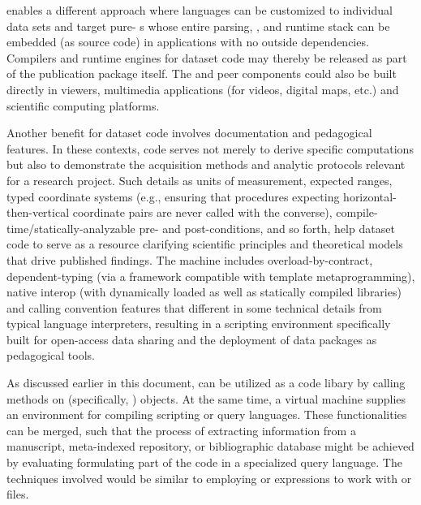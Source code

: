 \documentclass[11pt]{article}
\begin{document}
{{\begin{description}
\pseudoIndent{} \lPacTk{} enables a different approach where 
languages can be customized to individual data sets and target 
pure-\Cpp{} \VM{}s whose entire parsing, \IR{}, and runtime stack 
can be embedded (as source code) in \Cpp{} \GUI{} applications with no outside 
dependencies.  Compilers and runtime engines for dataset code may 
thereby be released as part of the publication package itself.  
The \VM{} and peer components could also be built directly 
in \PDF{} viewers, multimedia applications (for videos, digital 
maps, etc.) and scientific computing platforms.

\pseudoIndent{} Another \PacTk{} benefit for dataset code involves 
documentation and pedagogical features.  In these contexts, code 
serves not merely to derive specific computations but also 
to demonstrate the acquisition methods and analytic protocols relevant 
for a research project.  Such details as units of measurement, 
expected ranges, typed coordinate systems (e.g., ensuring that 
procedures expecting horizontal-then-vertical coordinate 
pairs are never called with the converse), 
compile-time/statically-analyzable pre- and post-conditions, and so forth, 
help dataset code to serve as a resource clarifying scientific 
principles and theoretical models that drive published findings.  
The \PacTk{} machine includes overload-by-contract, dependent-typing 
(via a framework compatible with template metaprogramming), native 
interop (with dynamically loaded as well as statically compiled libraries) 
and  calling convention features that different 
in some technical details from typical language interpreters, 
resulting in a scripting environment specifically built for 
open-access data sharing and the deployment of data packages 
as pedagogical tools.    

\item[Full-Text Query Languages]  As discussed earlier in this 
document, \PacTk{} can be utilized as a code libary by 
calling methods on \Cpp{} (specifically, \TSOM{}) objects.  
At the same time, a \PacTk{} virtual machine supplies an  
environment for compiling scripting or query languages.  
These functionalities can be merged, such that the process 
of extracting information from a \PDF{} manuscript, 
meta-indexed repository, or bibliographic database might be 
achieved by evaluating formulating part of the code in a 
specialized query language.  The techniques involved 
would be similar to employing \XQuery{} or \XQSE{} 
expressions to work with \JATS{} or \BITS{} files.


\end{description}}}
\end{document}
